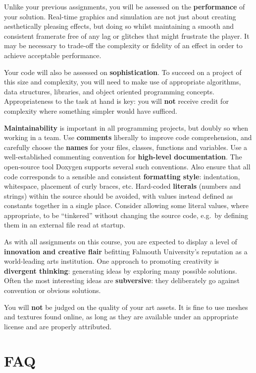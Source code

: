 \documentclass{../../fal_assignment}
\begin{document}
Unlike your previous assignments,
you will be assessed on the \textbf{performance} of your solution.
Real-time graphics and simulation are not just about creating aesthetically pleasing effects,
but doing so whilst maintaining a smooth and consistent framerate free of any lag or glitches that might frustrate the player.
It may be necessary to trade-off the complexity or fidelity of an effect
in order to achieve acceptable performance.

Your code will also be assessed on \textbf{sophistication}.
To succeed on a project of this size and complexity,
you will need to make use of appropriate algorithms, data structures, libraries, and object oriented programming concepts.
Appropriateness to the task at hand is key:
you will \textbf{not} receive credit for complexity  
where something simpler would have sufficed.

\textbf{Maintainability} is important in all programming projects,
but doubly so when working in a team.
Use \textbf{comments} liberally to improve code comprehension,
and carefully choose the \textbf{names} for your files, classes, functions and variables.
Use a well-established commenting convention
for \textbf{high-level documentation}.
The open-source tool Doxygen supports several such conventions.
Also ensure that all code corresponds to a sensible and consistent \textbf{formatting style}:
indentation, whitespace, placement of curly braces, etc.
Hard-coded \textbf{literals} (numbers and strings) within the source should be avoided,
with values instead defined as constants together in a single place.
Consider allowing some literal values, where appropriate, to be ``tinkered'' without changing the source code,
e.g.\ by defining them in an external file read at startup.

As with all assignments on this course, you are expected to display a level of
\textbf{innovation and creative flair} befitting Falmouth University's reputation as a world-leading
arts institution.
One approach to promoting creativity is
\textbf{divergent thinking}: generating ideas by exploring many possible solutions.
Often the most interesting ideas are \textbf{subversive}: they deliberately go against
convention or obvious solutions.

You will \textbf{not} be judged on the quality of your art assets.
It is fine to use meshes and textures found online,
as long as they are available under an appropriate license and are properly attributed.

\section*{FAQ}
\end{document}
